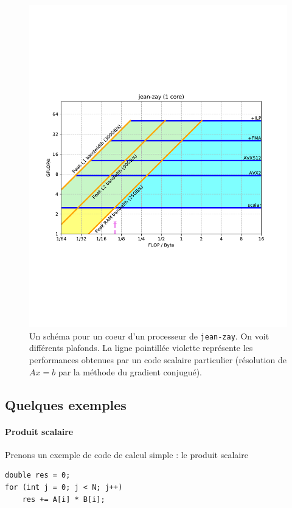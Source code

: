\begin{figure}
  \centering
  \includegraphics[width=\textwidth]{roofline_jz.pdf}
  \caption{Un schéma  pour un coeur d'un processeur de
    \texttt{jean-zay}. On voit différents \og plafonds\fg. La ligne pointillée
    violette représente les performances obtenues par un code scalaire
    particulier (résolution de $Ax=b$ par la méthode du gradient conjugué).
    \label{fig:roofline-jz}}
\end{figure}

\subsection{Quelques exemples}

\paragraph{Produit scalaire} Prenons un exemple de code de calcul simple : le produit scalaire
\begin{verbatim}
double res = 0;
for (int j = 0; j < N; j++)
    res += A[i] * B[i];
\end{verbatim}

